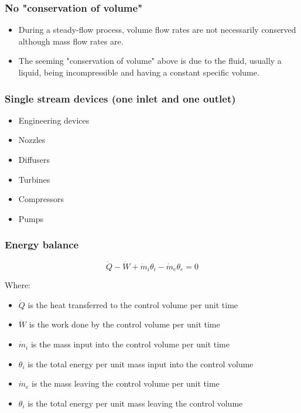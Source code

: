 \documentclass[11pt]{article}
\begin{document}
\subsubsection{No "conservation of volume"}
\label{sec:org743783c}
\begin{itemize}
\item During a steady-flow process, volume flow rates are not necessarily conserved although mass flow rates are.
\item The seeming "conservation of volume" above is due to the fluid, usually a liquid, being incompressible and having a constant specific volume.
\end{itemize}

\subsubsection{Single stream devices (one inlet and one outlet)}
\label{sec:org444950c}
\begin{itemize}
\item Engineering devices
\item Nozzles
\item Diffusers
\item Turbines
\item Compressors
\item Pumps
\end{itemize}

\newpage

\subsubsection{Energy balance}
\label{sec:org01894c5}
\[\dot{Q} - \dot{W} + \dot{m}_i \theta_i - \dot{m}_e \theta_e = 0 \tag{1}\]

Where:
\begin{itemize}
\item \(\dot{Q}\) is the heat transferred to the control volume per unit time
\item \(\dot{W}\) is the work done by the control volume per unit time
\item \(\dot{m}_i\) is the mass input into the control volume per unit time
\item \(\theta_i\) is the total energy per unit mass input into the control volume
\item \(\dot{m}_e\) is the mass leaving the control volume per unit time
\item \(\theta_i\) is the total energy per unit mass leaving the control volume
\end{itemize}
\end{document}

